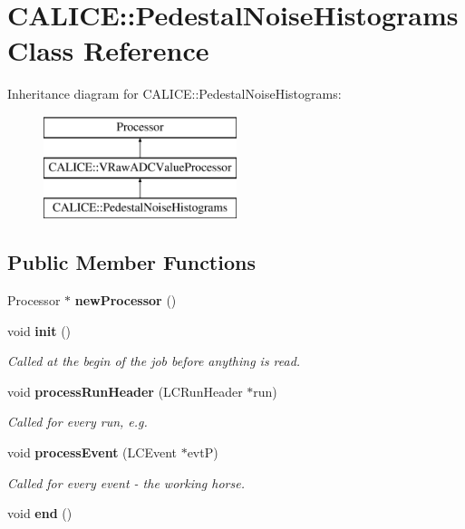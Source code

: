 \section{C\-A\-L\-I\-C\-E\-:\-:Pedestal\-Noise\-Histograms Class Reference}
\label{classCALICE_1_1PedestalNoiseHistograms}
Inheritance diagram for C\-A\-L\-I\-C\-E\-:\-:Pedestal\-Noise\-Histograms\-:\begin{figure}[H]
\begin{center}
\leavevmode
\includegraphics[height=3.000000cm]{classCALICE_1_1PedestalNoiseHistograms}
\end{center}
\end{figure}
\subsection*{Public Member Functions}
\begin{DoxyCompactItemize}
\item 
Processor $\ast$ {\bfseries new\-Processor} ()\label{classCALICE_1_1PedestalNoiseHistograms_ae5a513bca3d9c3fa642c3006723a3c40}

\item 
void {\bf init} ()
\begin{DoxyCompactList}\small\item\em Called at the begin of the job before anything is read. \end{DoxyCompactList}\item 
void {\bf process\-Run\-Header} (L\-C\-Run\-Header $\ast$run)
\begin{DoxyCompactList}\small\item\em Called for every run, e.\-g. \end{DoxyCompactList}\item 
void {\bf process\-Event} (L\-C\-Event $\ast$evt\-P)
\begin{DoxyCompactList}\small\item\em Called for every event -\/ the working horse. \end{DoxyCompactList}\item 
void {\bfseries end} ()\label{classCALICE_1_1PedestalNoiseHistograms_a0b92f798c4e9e32ffb7e938136db8e20}

\end{DoxyCompactItemize}
